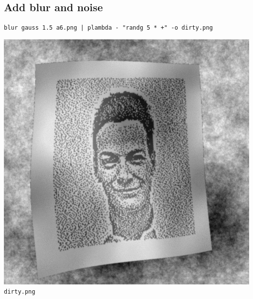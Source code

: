 \subsection{Add blur and noise}
\begin{verbatim}
blur gauss 1.5 a6.png | plambda - "randg 5 * +" -o dirty.png
\end{verbatim}
\includegraphics{dirty.png}\verb+dirty.png+

\clearpage
